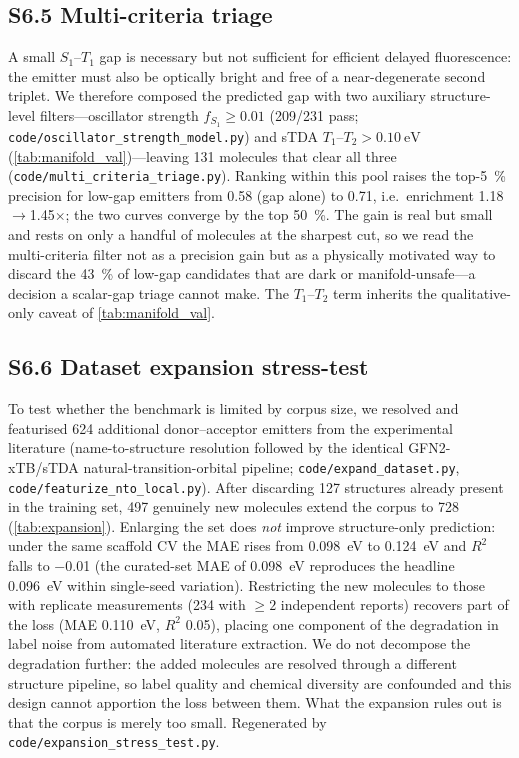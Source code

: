 \documentclass[twoside,twocolumn,9pt]{extarticle}
\begin{document}
\subsection*{S6.5 Multi-criteria triage}
A small $S_1$--$T_1$ gap is necessary but not sufficient for efficient delayed
fluorescence: the emitter must also be optically bright and free of a near-degenerate
second triplet. We therefore composed the predicted gap with two auxiliary structure-level
filters---oscillator strength $f_{S_1}\ge\num{0.01}$ (\num{209}/\num{231} pass;
\texttt{code/oscillator\_strength\_model.py}) and sTDA $T_1$--$T_2 > \qty{0.10}{\electronvolt}$
(\cref{tab:manifold_val})---leaving \num{131} molecules that clear all three
(\texttt{code/multi\_criteria\_triage.py}). Ranking within this pool raises the top-\qty{5}{\percent}
precision for low-gap emitters from \num{0.58} (gap alone) to \num{0.71}, i.e.\ enrichment
\num{1.18}$\rightarrow$\num{1.45}$\times$; the two curves converge by the top \qty{50}{\percent}.
The gain is real but small and rests on only a handful of molecules at the sharpest cut, so we
read the multi-criteria filter not as a precision gain but as a physically motivated way
to discard the \qty{43}{\percent} of low-gap candidates that are dark or manifold-unsafe---a
decision a scalar-gap triage cannot make. The $T_1$--$T_2$ term inherits the qualitative-only
caveat of \cref{tab:manifold_val}.

\subsection*{S6.6 Dataset expansion stress-test}
To test whether the benchmark is limited by corpus size, we resolved and featurised
\num{624} additional donor--acceptor emitters from the experimental literature
(name-to-structure resolution followed by the identical GFN2-xTB/sTDA natural-transition-orbital
pipeline; \texttt{code/expand\_dataset.py}, \texttt{code/featurize\_nto\_local.py}). After
discarding \num{127} structures already present in the training set, \num{497} genuinely new
molecules extend the corpus to \num{728} (\cref{tab:expansion}). Enlarging the set does
\emph{not} improve structure-only prediction: under the same scaffold CV the MAE rises from
\qty{0.098}{\electronvolt} to \qty{0.124}{\electronvolt} and $R^2$ falls to \num{-0.01} (the
curated-set MAE of \qty{0.098}{\electronvolt} reproduces the headline \qty{0.096}{\electronvolt}
within single-seed variation). Restricting the new molecules to those with replicate
measurements (\num{234} with $\ge\num{2}$ independent reports) recovers part of the loss
(MAE \qty{0.110}{\electronvolt}, $R^2$ \num{0.05}), placing one component of the degradation in
label noise from automated literature extraction. We do not decompose the degradation
further: the added molecules are resolved through a different structure pipeline, so
label quality and chemical diversity are confounded and this design cannot apportion the
loss between them. What the expansion rules out is that the corpus is merely too small. Regenerated by \texttt{code/expansion\_stress\_test.py}.
\end{document}
